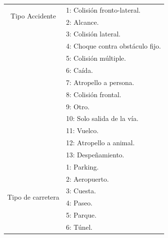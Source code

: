 \begin{enumerate}
\begin{table}[H]
\begin{minipage}{0.4\textwidth}
\begin{tabular}{|c|l|}
                                \hline
                                \multirow{2}{*}{Tipo Accidente}         & 1: Colisión fronto-lateral. \\
                                                                        & 2: Alcance.\\
                                                                        & 3: Colisión lateral.\\
                                                                        & 4: Choque contra obstáculo fijo.\\
                                                                        & 5: Colisión múltiple.\\
                                                                        & 6: Caída.\\
                                                                        & 7: Atropello a persona.\\
                                                                        & 8: Colisión frontal.\\
                                                                        & 9: Otro.\\
                                                                        & 10: Solo salida de la vía.\\
                                                                        & 11: Vuelco.\\
                                                                        & 12: Atropello a animal.\\
                                                                        & 13: Despeñamiento.\\
                                \hline
                                \multirow{11}{*}{Tipo de carretera}      & 1: Parking. \\
                                                                        & 2: Aeropuerto.\\
                                                                        & 3: Cuesta.\\
                                                                        & 4: Paseo.\\
                                                                        & 5: Parque.\\
                                                                        & 6: Túnel.\\

\end{tabular}
\end{minipage}
\end{table}
\end{enumerate}
